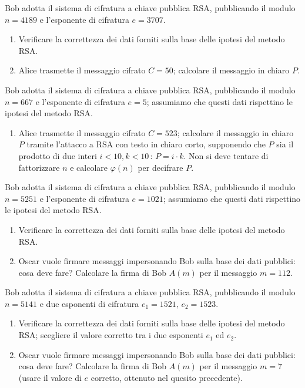         Bob adotta il sistema di cifratura a chiave pubblica RSA, pubblicando il modulo $n=4189$ e 
        l'esponente di cifratura $e=3707$.
        \begin{enumerate}
            \item Verificare la correttezza dei dati forniti sulla base delle ipotesi del metodo RSA.
            \item Alice trasmette il messaggio cifrato $C=50$; calcolare il messaggio in chiaro $P$.
        \end{enumerate}

        Bob adotta il sistema di cifratura a chiave pubblica RSA, pubblicando il modulo $n=667$ e 
        l'esponente di cifratura $e=5$; assumiamo che questi dati rispettino le ipotesi del metodo RSA.
        \begin{enumerate}
            \item Alice trasmette il messaggio cifrato $C=523$; calcolare il messaggio in chiaro $P$ tramite 
                l'attacco a RSA con testo in chiaro corto, supponendo che $P$ sia il prodotto di due interi 
                $i<10, k<10 \,:\, P=i\cdot k$. Non si deve tentare di fattorizzare $n$ e calcolare $\varphi(n)$ 
                per decifrare $P$.
        \end{enumerate}

        Bob adotta il sistema di cifratura a chiave pubblica RSA, pubblicando il modulo $n=5251$ e 
        l'esponente di cifratura $e=1021$; assumiamo che questi dati rispettino le ipotesi del metodo RSA.
        \begin{enumerate}
            \item Verificare la correttezza dei dati forniti sulla base delle ipotesi del metodo RSA.
            \item Oscar vuole firmare messaggi impersonando Bob sulla base dei dati pubblici: cosa deve 
                fare? Calcolare la firma di Bob $A(m)$ per il messaggio $m=112$.
        \end{enumerate}

        Bob adotta il sistema di cifratura a chiave pubblica RSA, pubblicando il modulo $n=5141$ e 
        due esponenti di cifratura $e_1=1521,\,e_2=1523$.
        \begin{enumerate}
            \item Verificare la correttezza dei dati forniti sulla base delle ipotesi del metodo RSA; 
                scegliere il valore corretto tra i due esponenti $e_1$ ed $e_2$.
            \item Oscar vuole firmare messaggi impersonando Bob sulla base dei dati pubblici: cosa deve 
                fare? Calcolare la firma di Bob $A(m)$ per il messaggio $m=7$ (usare il valore di $e$ 
                corretto, ottenuto nel quesito precedente).
        \end{enumerate}

